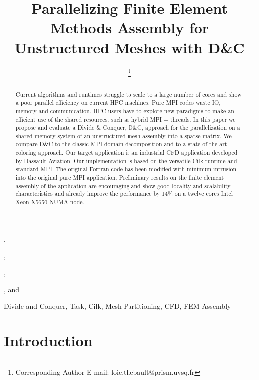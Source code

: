 \documentclass[10pt]{IOS-Book-Article}
\begin{document}
\begin{frontmatter}              %

\title{Parallelizing Finite Element Methods Assembly for Unstructured Meshes with D\&C}

\author[A]{ %
\thanks{Corresponding Author E-mail: loic.thebault@prism.uvsq.fr}},
\author[A]{ },
\author[C]{ },
\author[B]{ },
and
\author[A,C]{ }

\address[A]{PRISM - University of Versailles, France}
\address[B]{Dassault Aviation, Saint-Cloud, France}
\address[C]{Exascale Computing Research, France}

\begin{abstract}
Current algorithms and runtimes struggle to scale to a large number of cores and show a poor parallel efficiency on current HPC machines.
Pure MPI codes waste IO, memory and communication. HPC users have to explore new paradigms to make an efficient use of the shared resources, such as hybrid MPI + threads.
In this paper we propose and evaluate a Divide \& Conquer, D\&C, approach for the parallelization  on a shared memory system of an unstructured mesh assembly into a sparse matrix.
We compare D\&C to the classic MPI domain decomposition and to a state-of-the-art coloring approach.
Our target application is an industrial CFD application developed by Dassault Aviation.
Our implementation is based on the versatile Cilk runtime and standard MPI.
The original Fortran code has been modified with minimum intrusion into the original pure MPI application.
Preliminary results on the finite element assembly of the application are encouraging and show good locality and scalability characteristics and already improve the performance by 14\% on a twelve cores Intel Xeon X5650 NUMA node.
\end{abstract}

\begin{keyword}
Divide and Conquer, Task, Cilk, Mesh Partitioning, CFD, FEM Assembly
\end{keyword}
\end{frontmatter}

\thispagestyle{empty}
\pagestyle{empty}

\section{Introduction}
\end{document}
